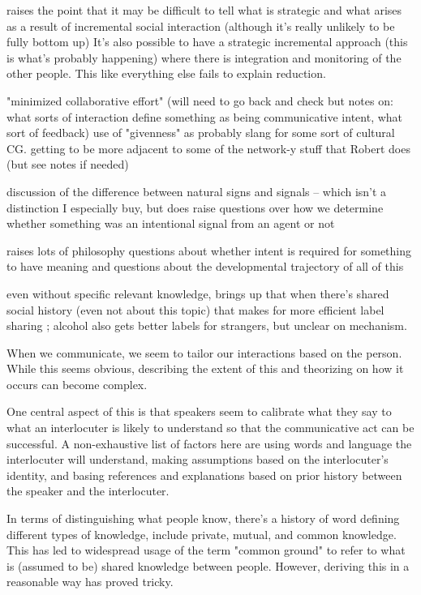 \documentclass[]{article}
\begin{document}
\cite{rogers2013} raises the point that it may be difficult to tell what is strategic and what arises as a result of incremental social interaction (although it's really unlikely to be fully bottom up) It's also possible to have a strategic incremental approach (this is what's probably happening) where there is integration and monitoring of the other people. This like everything else fails to explain reduction. 

\cite{fay2010} "minimized collaborative effort" (will need to go back and check but notes on: what sorts of interaction define something as being communicative intent, what sort of feedback) use of "givenness" as probably slang for some sort of cultural CG. getting to be more adjacent to some of the network-y stuff that Robert does (but see notes if needed) 


\cite{clark1996}
discussion of the difference between natural signs and signals -- which isn't a distinction I especially buy, but does raise questions over how we determine whether something was an intentional signal from an agent or not 

raises lots of philosophy questions about whether intent is required for something to have meaning and questions about the developmental trajectory of all of this 

even without specific relevant knowledge, \cite{garrison2022} brings up that when there's shared social history (even not about this topic) that makes for more efficient label sharing ; alcohol also gets better labels for strangers, but unclear on mechanism. 


When we communicate, we seem to tailor our interactions based on the person. While this seems obvious, describing the extent of this and theorizing on how it occurs can become complex. 

One central aspect of this is that speakers seem to calibrate what they say to what an interlocuter is likely to understand so that the communicative act can be successful. A non-exhaustive list of factors here are using words and language the interlocuter will understand, making assumptions based on the interlocuter's identity, and basing references and explanations based on prior history between the speaker and the interlocuter. 

In terms of distinguishing what people know, there's a history of word defining different types of knowledge, include private, mutual, and common knowledge. This has led to widespread usage of the term "common ground" to refer to what is (assumed to be) shared knowledge between people. However, deriving this in a reasonable way has proved tricky.
\end{document}
